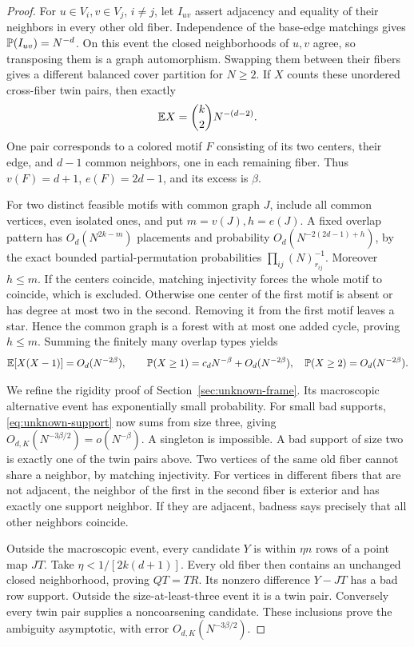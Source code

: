 \begin{proof}
For $u\in V_i,v\in V_j$, $i\ne j$, let $I_{uv}$ assert adjacency
and equality of their neighbors in every other old fiber. Independence
of the base-edge matchings gives $\mathbb P(I_{uv})=N^{-d}$.
On this event the closed neighborhoods of $u,v$ agree, so transposing
them is a graph automorphism. Swapping them between their fibers gives
a different balanced cover partition for $N\ge2$. If $X$ counts these
unordered cross-fiber twin pairs, then exactly
\[
 \mathbb E X=\binom k2N^{-(d-2)}.
\]
One pair corresponds to a colored motif $F$ consisting of its two
centers, their edge, and $d-1$ common neighbors, one in each remaining
fiber. Thus $v(F)=d+1$, $e(F)=2d-1$, and its excess is $\beta$.

For two distinct feasible motifs with common graph $J$, include all
common vertices, even isolated ones, and put $m=v(J),h=e(J)$.
A fixed overlap pattern has $O_d(N^{2k-m})$ placements and probability
$O_d(N^{-2(2d-1)+h})$, by the exact bounded partial-permutation
probabilities $\prod_{ij}(N)_{r_{ij}}^{-1}$.
Moreover $h\le m$. If the centers coincide, matching injectivity
forces the whole motif to coincide, which is excluded. Otherwise
one center of the first motif is absent or has degree at most two in
the second. Removing it from the first motif leaves a star. Hence
the common graph is a forest with at most one added cycle, proving
$h\le m$. Summing the finitely many overlap types yields
\[
 \mathbb E[X(X-1)]=O_d(N^{-2\beta}),\qquad
 \mathbb P(X\ge1)=c_dN^{-\beta}+O_d(N^{-2\beta}),\quad
 \mathbb P(X\ge2)=O_d(N^{-2\beta}).
\]

We refine the rigidity proof of Section~\ref{sec:unknown-frame}.
Its macroscopic alternative event has exponentially small probability.
For small bad supports, \eqref{eq:unknown-support} now sums from
size three, giving $O_{d,K}(N^{-3\beta/2})=o(N^{-\beta})$.
A singleton is impossible. A bad support of size two is exactly one
of the twin pairs above. Two vertices of the same old fiber cannot
share a neighbor, by matching injectivity. For vertices in different
fibers that are not adjacent, the neighbor of the first in the second
fiber is exterior and has exactly one support neighbor. If they are
adjacent, badness says precisely that all other neighbors coincide.

Outside the macroscopic event, every candidate $Y$ is within $\eta n$
rows of a point map $JT$. Take $\eta<1/[2k(d+1)]$. Every old fiber
then contains an unchanged closed neighborhood, proving $QT=TR$.
Its nonzero difference $Y-JT$ has a bad row support. Outside the
size-at-least-three event it is a twin pair. Conversely every twin
pair supplies a noncoarsening candidate. These inclusions prove the
ambiguity asymptotic, with error $O_{d,K}(N^{-3\beta/2})$.


\end{proof}
